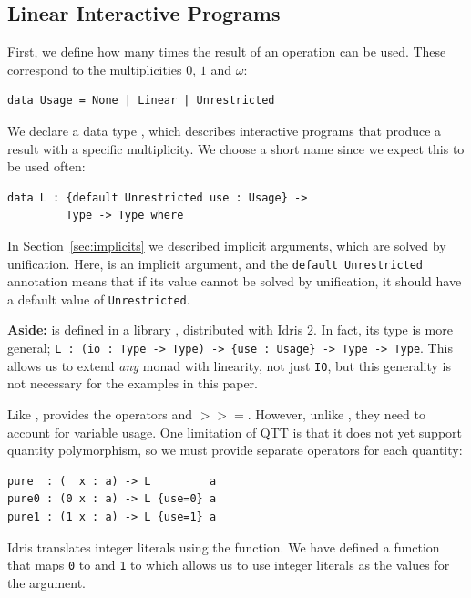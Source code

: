 \subsection{Linear Interactive Programs}

First, we define how many times the result of an operation can be used.
These correspond to the multiplicities $0$, $1$ and $\omega$:

\begin{lstlisting}
data Usage = None | Linear | Unrestricted
\end{lstlisting}

We declare a data type , which describes interactive programs that
produce a result with a specific multiplicity. We choose a short name 
since we expect this to be used often:

\begin{lstlisting}
data L : {default Unrestricted use : Usage} ->
         Type -> Type where
\end{lstlisting}

In Section~\ref{sec:implicits} we described implicit arguments, which are
solved by unification. Here,  is an implicit argument, and the
\texttt{default Unrestricted} annotation means that if its value cannot be
solved by unification, it should have a default value of \texttt{Unrestricted}.

\textbf{Aside:}  is defined in a library ,
distributed with Idris 2. In fact, its type is more general;
\texttt{L : (io : Type -> Type) -> \{use : Usage\} -> Type -> Type}. This
allows us to extend \emph{any} monad with linearity, not just \texttt{IO},
but this generality is not necessary for the examples in this paper.

Like ,  provides the operators  and $\mathtt{>>=}$.
However, unlike , they need to account for variable usage. One limitation
of QTT is that it does not yet support quantity polymorphism, so we must
provide separate  operators for each quantity:

\begin{lstlisting}
pure  : (  x : a) -> L         a
pure0 : (0 x : a) -> L {use=0} a
pure1 : (1 x : a) -> L {use=1} a
\end{lstlisting}

Idris translates integer literals using the  function. We
have defined a  function that maps \texttt{0} to
 and \texttt{1} to  which allows us to use integer
literals as the values for the  argument.

